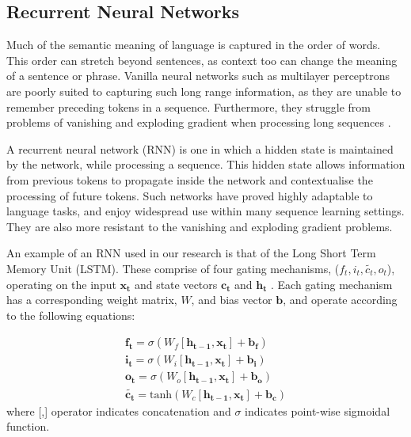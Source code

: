 
\subsection{Recurrent Neural Networks} %
\label{sub:recurrent_neural_networks}

Much of the semantic meaning of language is captured in the order of words. 
This order can stretch beyond sentences, as context too can change the meaning of a sentence or phrase.
Vanilla neural networks such as multilayer perceptrons are poorly suited to capturing such long range information, as they are unable to remember preceding tokens in a sequence. 
Furthermore, they struggle from problems of vanishing and exploding gradient when processing long sequences \cite{bengio_learning_1994}.

A recurrent neural network (RNN) is one in which a hidden state is maintained by the network, while processing a sequence.
This hidden state allows information from previous tokens to propagate inside the network and contextualise the processing of future tokens.
Such networks have proved highly adaptable to language tasks, and enjoy widespread use within many sequence learning settings\cite{lipton_critical_2015}. They are also more resistant to the vanishing and exploding gradient problems.

An example of an RNN used in our research is that of the Long Short Term Memory Unit (LSTM)\cite{hochreiter_long_1997}. These comprise of four gating mechanisms, ($f_t, i_t,\tilde{c_t}, o_t$), operating on the input $\mathbf{x_t}$ and state vectors $\mathbf{c_t}$ and $\mathbf{h_t}$
\cite{noauthor_understanding_nodate}. Each gating mechanism has a corresponding weight matrix, $W$, and bias vector $\mathbf{b}$, and operate according to the following equations:

\begin{align}
    \mathbf{f_t} = \sigma(W_f [\mathbf{h_{t-1}}, \mathbf{x_t}] + \mathbf{b_f})\label{eq:lstm1}\\
    \mathbf{i_t} = \sigma(W_i [\mathbf{h_{t-1}}, \mathbf{x_t}] + \mathbf{b_i}) \label{eq:lstm2}\\
    \mathbf{o_t} = \sigma(W_o [\mathbf{h_{t-1}}, \mathbf{x_t}] + \mathbf{b_o}) \label{eq:lstm3}\\
    \mathbf{\tilde{c_t}} = \text{tanh}(W_c [\mathbf{h_{t-1}}, \mathbf{x_t}] + \mathbf{b_c}) \label{eq:lstm4}
\end{align}
where [,] operator indicates concatenation and $\sigma$ indicates point-wise sigmoidal function.

